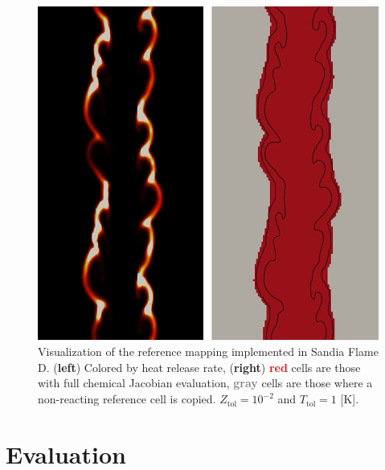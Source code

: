\documentclass[letterpaper,twocolumn,10pt]{article}
\begin{document}
\begin{figure}[h!]
    \centering
    \includegraphics[width=\linewidth]{Figures/Ref_Map.PNG}
    \caption{Visualization of the reference mapping implemented in Sandia Flame D. (\textbf{left}) Colored by heat release rate, (\textbf{right}) \textcolor{red}{\textbf{red}} cells are those with full chemical Jacobian evaluation, \textcolor{gray}{\textbf{gray}} cells are those where a non-reacting reference cell is copied. $Z_\textrm{tol} = 10^{-2}$ and $T_\textrm{tol} = 1$ [K].}
    \label{fig:RefMap}
\end{figure}

\section{Evaluation}
\end{document}
